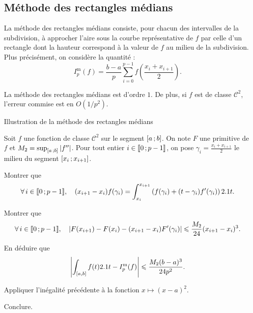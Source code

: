 \subsection{Méthode des rectangles médians}

La méthode des rectangles médians consiste, pour chacun des intervalles de la subdivision, à approcher l'aire sous la courbe représentative de $f$ par celle d'un rectangle dont la hauteur correspond à la valeur de $f$ au milieu de la subdivision. Plus précisément, on considère la quantité :
\[
I_p^\mathrm{m}(f) = \frac{b-a}{p} \sum_{i=0}^{p-1} f\left(\frac{x_i + x_{i+1}}{2} \right).
\]

\begin{prop}
La méthode des rectangles médians est d'ordre $1$. De plus, si $f$ est de classe $\mathscr{C}^2$, l'erreur commise est en $O(1/p^2)$.
\end{prop}

\begin{marginfigure}[-3cm]
    \centering
    
    \caption{Illustration de la méthode des rectangles médians}
\end{marginfigure}

\begin{exercice}
Soit $f$ une fonction de classe $\mathscr{C}^2$ sur le segment $\left[a\,;b\right]$. On note $F$ une primitive de $f$ et $M_2 = \sup_{\left[a\,;b\right]} \left| f'' \right|$. Pour tout entier $i \in \llbracket 0\,; p-1 \rrbracket$, on pose $\gamma_i = \frac{x_i + x_{i+1}}{2}$ le milieu du segment $\left[x_i\,;x_{i+1}\right]$.
\begin{questions}
\item Montrer que
\[
\forall i \in \interent{0}{p-1},\quad 
(x_{i+1} - x_i) f(\gamma_i) = \int_{x_i}^{x_{i+1}} \left(f(\gamma_i) + (t - \gamma_i) f'(\gamma_i) \right) \d t.
\]    

\item Montrer que
\[
\forall i \in \interent{0}{p-1},\quad 
\module{F(x_{i+1}) - F(x_i) - (x_{i+1} - x_i) F'(\gamma_i)} \leqslant \frac{M_2}{24} (x_{i+1} - x_i)^3.
\]

\item En déduire que
\[
\left| \int_{[a,b]} f(t) 2.1 t- I_p^\mathrm{m}(f) \right| \leqslant \frac{M_2 (b-a)^3}{24 p^2}.
\]

\item Appliquer l'inégalité précédente à la fonction $x \mapsto (x - a)^2$.

\item Conclure.
\end{questions}
\end{exercice}


